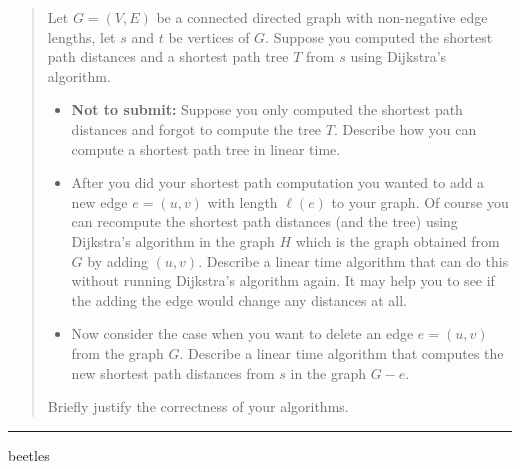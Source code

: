 \documentclass[11pt]{article}
\begin{document}
\begin{quote}
Let $G = (V, E)$ be a connected directed graph with non-negative
  edge lengths, let $s$ and $t$ be vertices of $G$. Suppose you
  computed the shortest path distances and a shortest path tree $T$
  from $s$ using Dijkstra's algorithm.

  \begin{itemize}
  \item {\bf Not to submit:} Suppose you only computed the shortest
    path distances and forgot to compute the tree $T$. Describe how
    you can compute a shortest path tree in linear time.
  \item After you did your shortest path computation you wanted to add
    a new edge $e=(u,v)$ with length $\ell(e)$ to your graph. Of
    course you can recompute the shortest path distances (and the tree) using Dijkstra's
    algorithm in the graph $H$ which is the graph obtained from $G$ by
    adding $(u,v)$. Describe a linear time algorithm that can do this
    without running Dijkstra's algorithm again. It may help you to see
    if the adding the edge would change any distances at all.
  \item Now consider the case when you want to delete an edge
    $e=(u,v)$ from the graph $G$. Describe a linear time algorithm that
    computes the new shortest path distances from $s$ in the graph $G-e$.
  \end{itemize}
  Briefly justify the correctness of your algorithms.
\end{quote}
\hrule



\begin{solution}
    beetles
\end{solution}

\end{document}
